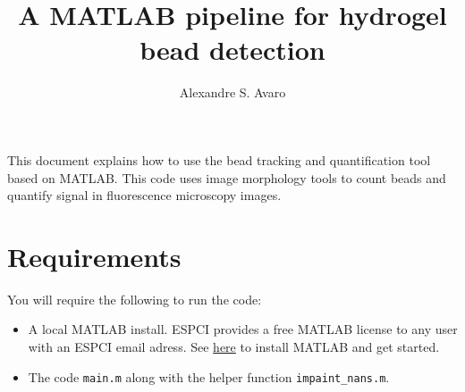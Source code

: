 \documentclass[a4paper]{article}
\begin{document}
\title{A \textsc{MATLAB} pipeline for hydrogel bead detection}
\author{Alexandre S. Avaro}
\maketitle

This document explains how to use the bead tracking and quantification tool based on MATLAB. This code uses image morphology tools to count beads and quantify signal in fluorescence microscopy images. 

\section{Requirements}
You will require the following to run the code:
\begin{itemize}
    \item A local MATLAB install. ESPCI provides a free MATLAB license to any user with an ESPCI email adress. See \href{https://www.mathworks.com/academia/tah-portal/espci-30728296.html}{here} to install MATLAB and get started.
    \item The code \verb|main.m| along with the helper function \verb|impaint_nans.m|.
\end{itemize}
\end{document}
